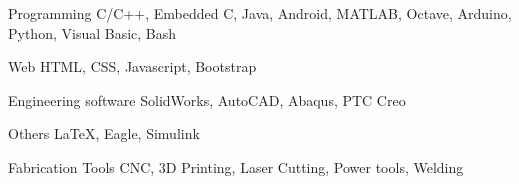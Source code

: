 


\begin{cvskills}

	\cvskill
	{Programming} %
	{C/C++, Embedded C, Java, Android, MATLAB, Octave, Arduino, Python, Visual Basic, Bash} %

	\cvskill
	{Web} %
	{HTML, CSS, Javascript, Bootstrap} %

	\cvskill
	{Engineering software} %
	{SolidWorks, AutoCAD, Abaqus, PTC Creo} %

	\cvskill
	{Others}
	{LaTeX, Eagle, Simulink}

	\cvskill
	{Fabrication Tools}
	{CNC, 3D Printing, Laser Cutting, Power tools, Welding}

\end{cvskills}
